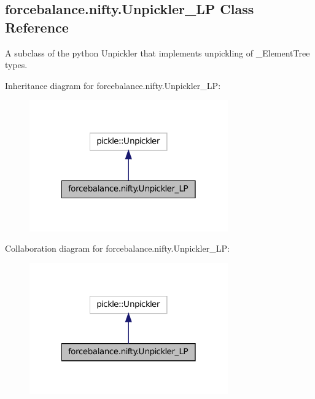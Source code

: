 \hypertarget{classforcebalance_1_1nifty_1_1Unpickler__LP}{\subsection{forcebalance.\-nifty.\-Unpickler\-\_\-\-L\-P Class Reference}
\label{classforcebalance_1_1nifty_1_1Unpickler__LP}
}


A subclass of the python Unpickler that implements unpickling of \-\_\-\-Element\-Tree types.  




Inheritance diagram for forcebalance.\-nifty.\-Unpickler\-\_\-\-L\-P\-:
\nopagebreak
\begin{figure}[H]
\begin{center}
\leavevmode
\includegraphics[width=242pt]{classforcebalance_1_1nifty_1_1Unpickler__LP__inherit__graph}
\end{center}
\end{figure}


Collaboration diagram for forcebalance.\-nifty.\-Unpickler\-\_\-\-L\-P\-:
\nopagebreak
\begin{figure}[H]
\begin{center}
\leavevmode
\includegraphics[width=242pt]{classforcebalance_1_1nifty_1_1Unpickler__LP__coll__graph}
\end{center}
\end{figure}

